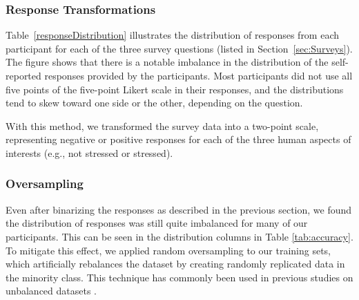 \subsubsection{Response Transformations}
Table~\ref{responseDistribution} illustrates the distribution of responses from each participant for each of the three survey questions (listed in Section~\ref{sec:Surveys}). The figure shows that there is a notable imbalance in the distribution of the self-reported responses provided by the participants. Most participants did not use all five points of the five-point Likert scale in their responses, and the distributions tend to skew toward one side or the other, depending on the question. 

With this method, we transformed the survey data into a two-point scale, representing  negative or positive responses for each of the three human aspects of interests (e.g., not stressed or stressed). 

\subsubsection{Oversampling}
Even after binarizing the responses as described in the previous section, we found the distribution of responses was still quite imbalanced for many of our participants. This can be seen in the distribution columns in Table \ref{tab:accuracy}. To mitigate this effect, we applied random oversampling to our training sets, which artificially rebalances the dataset by creating randomly replicated data in the minority class. This technique has commonly been used  in previous studies on unbalanced datasets \cite{chawla2004,yap2014}.

